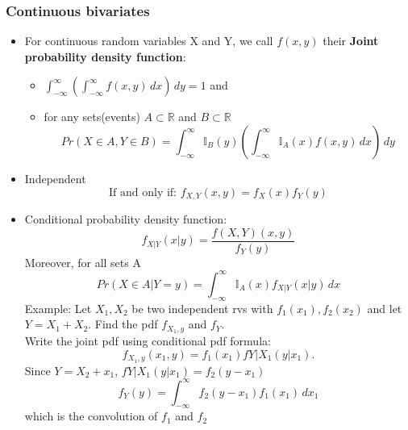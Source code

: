 \documentclass[12pt]{article}
\begin{document}
\subsubsection{Continuous bivariates}
\begin{itemize}
\item For continuous random variables X and Y, we call $f(x,y)$ their \textbf{Joint probability density function}:
\begin{itemize}
\item $\int_{-\infty}^{\infty} \left( \int_{-\infty}^{\infty} f(x,y) \,dx \right) \, dy =1$  and
\item for any sets(events) $A \subset \mathbb{R}$ and  $B \subset \mathbb{R}$
$$ Pr(X \in A, Y \in B) = \int_{-\infty}^{\infty} \mathbb{I}_B(y) \left( \int_{-\infty}^{\infty} \mathbb{I}_A(x)f(x,y) \, dx \right) \, dy $$


\end{itemize}
\item Independent
$$\textrm{If and only if:   } f_{X,Y}(x,y) = f_X(x)f_Y(y)$$
\item Conditional probability density function:
$$f_{X|Y}(x|y)=\frac{f(X,Y)(x,y)}{f_Y(y)}$$
Moreover, for all sets A
$$Pr(X \in A| Y =y) = \int_{-\infty}^{\infty} \mathbb{I}_A(x)f_{X|Y}(x|y) \, dx$$
Example: Let $X_1, X_2$ be two independent rvs with $f_1(x_1), f_2(x_2)$ and let $Y=X_1+X_2$. Find the pdf $f_{X_1,y}$ and $f_Y$. \\

Write the joint pdf using conditional pdf formula:
$$f_{X_1,y}(x_1,y) = f_1(x_1)f{Y|X_1}(y|x_1). $$
Since $Y=X_2+x_1$, $f{Y|X_1}(y|x_1) = f_2(y-x_1)$
$$f_Y(y) = \int_{-\infty}^{\infty} f_2(y-x_1)f_1(x_1) \, dx_1$$ 
which is the convolution of $f_1$ and $f_2$ 
\end{itemize}
\end{document}
